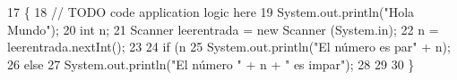 \begin{DoxyCode}
17                                            \{
18         \textcolor{comment}{// TODO code application logic here}
19        System.out.println(\textcolor{stringliteral}{"Hola Mundo"});
20        \textcolor{keywordtype}{int} n;
21        Scanner leerentrada = \textcolor{keyword}{new} Scanner (System.in);
22        n = leerentrada.nextInt();
23                
24        \textcolor{keywordflow}{if} (n%
25         System.out.println(\textcolor{stringliteral}{"El número es par"} + n);
26        \textcolor{keywordflow}{else}
27         System.out.println(\textcolor{stringliteral}{"El número "} + n +  \textcolor{stringliteral}{" es impar"});
28        
29 
30     \}
\end{DoxyCode}
